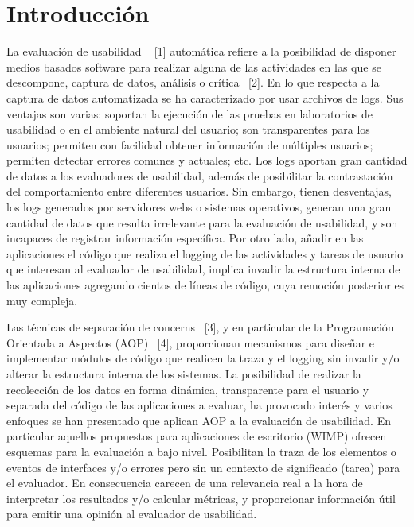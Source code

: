 \section{Introducción}
\label{sec:intro}

La evaluación de usabilidad ~\cite{ISO1998}  [1] automática refiere a la posibilidad de disponer medios basados software para realizar alguna de las actividades en las que se descompone, captura de datos, análisis o crítica~\cite{IH2001} [2]. En lo que respecta a la captura de datos automatizada se ha caracterizado por usar archivos de logs. Sus ventajas son varias: soportan la ejecución de las pruebas en laboratorios de usabilidad o en el ambiente natural del usuario; son transparentes para los usuarios; permiten con facilidad obtener información de múltiples usuarios; permiten detectar errores comunes y actuales; etc. Los logs aportan gran cantidad de datos a los evaluadores de usabilidad, además de posibilitar la contrastación del comportamiento entre diferentes usuarios. Sin embargo, tienen desventajas, los logs generados por servidores webs o sistemas operativos, generan una gran cantidad de datos que resulta irrelevante para la evaluación de usabilidad, y son incapaces de registrar información específica. Por otro lado, añadir en las aplicaciones el código que realiza el logging de las actividades y  tareas de usuario que interesan al evaluador de usabilidad, implica invadir la estructura interna de las aplicaciones agregando cientos de líneas de código, cuya remoción posterior es muy compleja.

Las técnicas de separación de concerns~\cite{KLM+1997} [3], y en particular de la Programación Orientada a Aspectos (AOP)~\cite{NIELSEN1992} [4], proporcionan mecanismos para diseñar e implementar módulos de código que realicen la traza y el logging sin invadir y/o alterar la estructura interna de los sistemas. La posibilidad de realizar la recolección de los datos en forma dinámica, transparente para el usuario y separada del código de las aplicaciones a evaluar, ha provocado interés y varios enfoques se han presentado que aplican AOP a la evaluación de usabilidad. En particular aquellos propuestos para aplicaciones de escritorio (WIMP) ofrecen esquemas para la evaluación a bajo nivel. Posibilitan la traza de los elementos o eventos de interfaces y/o errores pero sin un contexto de significado (tarea) para el evaluador. En consecuencia carecen de una relevancia real a la hora de interpretar los resultados y/o calcular métricas, y proporcionar información útil para emitir una opinión al evaluador de usabilidad. 

